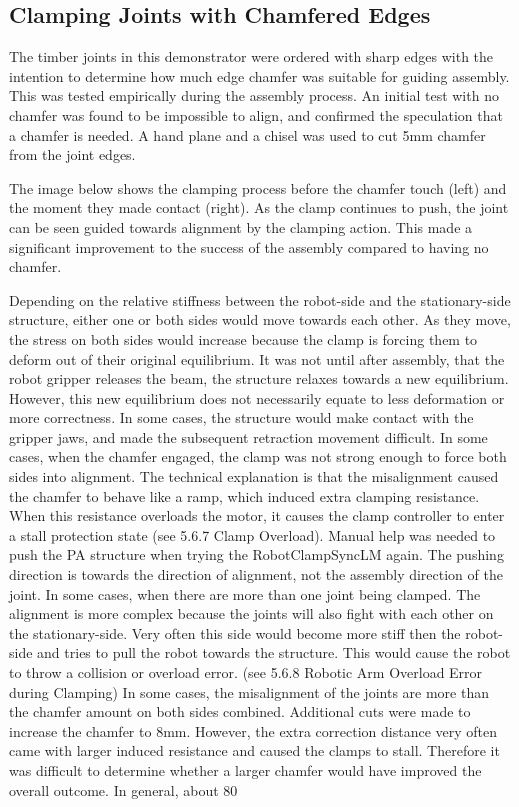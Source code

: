 \subsection{Clamping Joints with Chamfered Edges}

The timber joints in this demonstrator were ordered with sharp edges with the intention to determine how much edge chamfer was suitable for guiding assembly. This was tested empirically during the assembly process. 
An initial test with no chamfer was found to be impossible to align, and confirmed the speculation that a chamfer is needed. A hand plane and a chisel was used to cut 5mm chamfer from the joint edges.

The image below shows the clamping process before the chamfer touch (left) and the moment they made contact (right). As the clamp continues to push, the joint can be seen guided towards alignment by the clamping action. This made a significant improvement to the success of the assembly compared to having no chamfer.

Depending on the relative stiffness between the robot-side and the stationary-side structure, either one or both sides would move towards each other. As they move, the stress on both sides would increase because the clamp is forcing them to deform out of their original equilibrium. It was not until after assembly, that the robot gripper releases the beam, the structure relaxes towards a new equilibrium. However, this new equilibrium does not necessarily equate to less deformation or more correctness. In some cases, the structure would make contact with the gripper jaws, and made the subsequent retraction movement difficult. 
In some cases, when the chamfer engaged, the clamp was not strong enough to force both sides into alignment. The technical explanation is that the misalignment caused the chamfer to behave like a ramp, which induced extra clamping resistance. When this resistance overloads the motor, it causes the clamp controller to enter a stall protection state (see 5.6.7 Clamp Overload). Manual help was needed to push the PA structure when trying the RobotClampSyncLM again. The pushing direction is towards the direction of alignment, not the assembly direction of the joint.
In some cases, when there are more than one joint being clamped. The alignment is more complex because the joints will also fight with each other on the stationary-side. Very often this side would become more stiff then the robot-side and tries to pull the robot towards the structure. This would cause the robot to throw a collision or overload error. (see 5.6.8 Robotic Arm Overload Error during Clamping)
In some cases, the misalignment of the joints are more than the chamfer amount on both sides combined. Additional cuts were made to increase the chamfer to 8mm. However, the extra correction distance very often came with larger induced resistance and caused the clamps to stall. Therefore it was difficult to determine whether a larger chamfer would have improved the overall outcome. 
In general, about 80%

